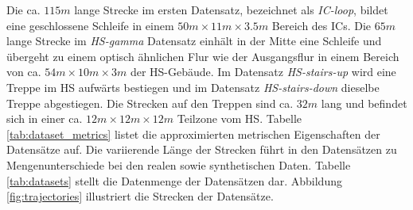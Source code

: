Die ca. $115m$ lange Strecke im ersten Datensatz, bezeichnet als \textit{IC-loop}, bildet eine geschlossene Schleife in einem $50m \times 11m \times 3.5m$ Bereich des ICs. Die $65m$ lange Strecke im \textit{HS-gamma} Datensatz einhält in der Mitte eine Schleife und übergeht zu einem optisch ähnlichen Flur wie der Ausgangsflur in einem Bereich von ca. $54m \times 10m \times 3m$ der HS-Gebäude. Im Datensatz \textit{HS-stairs-up} wird eine Treppe im HS aufwärts bestiegen und im Datensatz \textit{HS-stairs-down} dieselbe Treppe abgestiegen. Die Strecken auf den Treppen sind ca. $32m$ lang und befindet sich in einer ca. $12m \times 12m \times 12m$ Teilzone vom HS.
Tabelle \ref{tab:dataset_metrics} listet die approximierten metrischen Eigenschaften der Datensätze auf. 
Die variierende Länge der Strecken führt in den Datensätzen zu Mengenunterschiede bei den realen sowie synthetischen Daten. Tabelle \ref{tab:datasets} stellt die Datenmenge der Datensätzen dar.
Abbildung \ref{fig:trajectories} illustriert die Strecken der Datensätze. 
